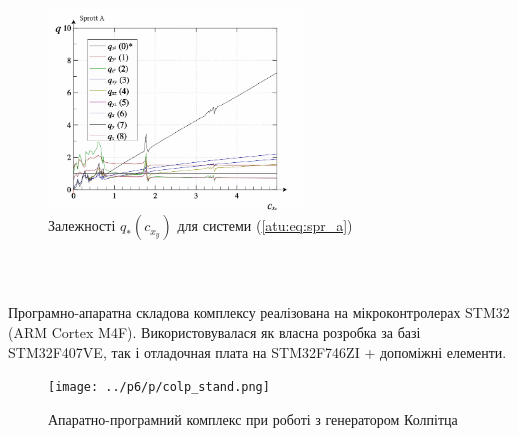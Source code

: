\documentclass[14pt,handout,utf8]{beamer}
\newcommand{\Xhead}[1]{
 \begin{center}%
      \textbf{#1}%
 \end{center}%
}
\begin{document}
\begin{frame}
  \frametitle{~}

  \Xhead{}

\begin{figure}
  \begin{center}
    \includegraphics[width=0.60\textwidth]{../p5/p/cha/spr_a/sprott_a_q-p_c_x_y.png}
  \end{center}
  \caption{Залежності $q_{*}(c_{x_y})$ для системи (\ref{atu:eq:spr_a})}
  \label{atu:f:spr_a_q}
\end{figure}


\end{frame}








\begin{frame}
  \frametitle{~}

  \Xhead{}

  Програмно-апаратна складова комплексу реалізована на
  мікроконтролерах STM32 (ARM Cortex M4F). Використовувалася як власна
  розробка за базі STM32F407VE, так і отладочная плата на STM32F746ZI +
  допоміжні елементи.

  \begin{figure}[ht!]
    \centerline{\texttt{[image: ../p6/p/colp\_stand.png]} }
    \caption{Апаратно-програмний комплекс при роботі з генератором Колпітца}
    \label{atu:colp_stand}
  \end{figure}



\end{frame}


\end{document}
